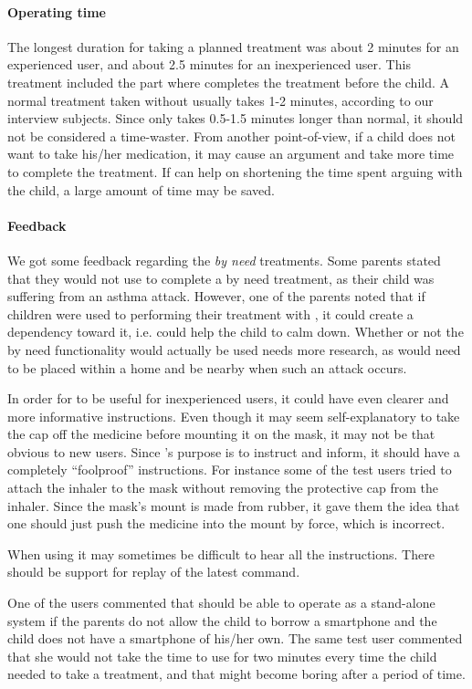 \paragraph{Operating time}
The longest duration for taking a planned treatment was about 2 minutes for an experienced user, and about 2.5 minutes for an inexperienced user. This treatment included the part where \buddy{} completes the treatment before the child. A normal treatment taken without \ab{} usually takes 1-2 minutes, according to our interview subjects. Since \ab{} only takes 0.5-1.5 minutes longer than normal, it should not be considered a time-waster. From another point-of-view, if a child does not want to take his/her medication, it may cause an argument and take more time to complete the treatment. If \ab{} can help on shortening the time spent arguing with the child, a large amount of time may be saved.      

\paragraph{Feedback}
We got some feedback regarding the \emph{by need} treatments. Some parents stated that they would not use \buddy{} to complete a by need treatment, as their child was suffering from an asthma attack. However, one of the parents noted that if children were used to performing their treatment with \buddy{}, it could create a dependency toward it, i.e. \buddy{} could help the child to calm down. Whether or not the by need functionality would actually be used needs more research, as \buddy{} would need to be placed within a home and be nearby when such an attack occurs. 

In order for \ab{} to be useful for inexperienced users, it could have even clearer and more informative instructions. Even though it may seem self-explanatory to take the cap off the medicine before mounting it on the mask, it may not be that obvious to new users. Since \ab{}'s purpose is to instruct and inform, it should have a completely ``foolproof'' instructions. For instance some of the test users tried to attach the inhaler to the mask without removing the protective cap from the inhaler. Since the mask's mount is made from rubber, it gave them the idea that one should just push the medicine into the mount by force, which is incorrect. 

When using \ab{} it may sometimes be difficult to hear all the instructions. There should be support for replay of the latest command.

One of the users commented that \ab{} should be able to operate as a stand-alone system if the parents do not allow the child to borrow a smartphone and the child does not have a smartphone of his/her own. The same test user commented that she would not take the time to use \ab{} for two minutes every time the child needed to take a treatment, and that \ab{} might become boring after a period of time.


